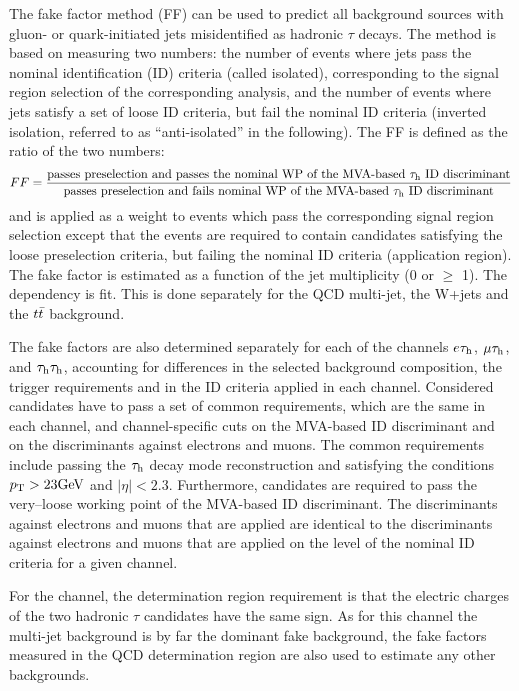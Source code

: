 The fake factor method (FF) can be used to predict all background sources with gluon- or quark-initiated jets misidentified as hadronic $\tau$ decays. The method is based on measuring two numbers: the number of events where jets pass the nominal \tauh identification (ID) criteria (called isolated), corresponding to the signal region selection of the corresponding analysis, and the number of events where jets satisfy a set of loose ID criteria, but fail the nominal \tauh ID criteria (inverted isolation, referred to as “anti-isolated” in the following). The FF is defined as the ratio of the two numbers:
\begin{equation}
    FF = \frac{\text{passes preselection and passes the nominal WP of the MVA-based \tauh ID discriminant}}{\text{passes preselection and fails nominal WP of the MVA-based \tauh ID discriminant}}
\end{equation}
and is applied as a weight to events which pass the corresponding signal region selection except that the events are required to contain \tauh candidates satisfying the loose preselection criteria, but failing the nominal \tauh ID criteria (application region). The fake factor is estimated as a function of the jet multiplicity (0 or $\geq$ 1). The \pt dependency is fit. This is done separately for the QCD multi-jet, the W+jets and the $t\Bar{t}$ background.

The fake factors are also determined separately for each of the channels $e\tau_{\rm h}$, $\mu\tau_{\rm h}$, and $\tau_{\rm h}\tau_{\rm h}$, accounting for differences in the selected background composition, the trigger requirements and in the \tauh ID criteria applied in each channel. Considered candidates have to pass a set of common requirements, which are the same in each channel, and channel-specific cuts on the MVA-based \tauh ID discriminant and on the discriminants against electrons and muons. The common requirements include passing the $\tau_{\rm h}$ decay mode reconstruction and satisfying the conditions $p_{\mathrm{T}} > 23 \mathrm{GeV}$ and $|\eta| < 2.3$. Furthermore, candidates are required to pass the very–loose working point of the MVA-based \tauh ID discriminant. The discriminants against electrons and muons that are applied are identical to the discriminants against electrons and muons that are applied on the level of the nominal \tauh ID criteria for a given channel.

For the \tauh\tauh channel, the determination region requirement is that the electric charges of the two hadronic $\tau$ candidates have the same sign. As for this channel the multi-jet background is by far the dominant fake background, the fake factors measured in the QCD determination region are also used to estimate any other backgrounds.

